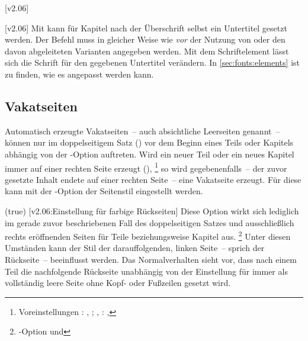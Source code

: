 \begin{DeclareEntity*}{}
\begin{DeclareEntity*}{}
\begin{DeclareEntity*}{}
\begin{Declaration}
  {}
  [v2.06]
\begin{Declaration}
  {}
  [v2.06]
Mit  kann für Kapitel nach der 
Überschrift selbst ein Untertitel gesetzt werden. Der Befehl muss in gleicher 
Weise wie  \emph{vor} der Nutzung von  
oder den davon abgeleiteten Varianten angegeben werden. Mit dem Schriftelement 
 lässt sich die Schrift für den gegebenen Untertitel 
verändern. In \autoref{sec:fonts:elements} ist zu finden, wie es angepasst 
werden kann.
%
\end{Declaration}
\end{Declaration}



\subsection{%
  Vakatseiten%
  \label{sec:vacat}%
}
%
Automatisch erzeugte Vakatseiten~-- auch absichtliche Leerseiten genannt~-- 
können nur im doppelseitigem Satz () vor dem Beginn eines 
Teils oder Kapitels abhängig von der \KOMAScript-Option 
 auftreten. Wird ein neuer Teil oder 
ein neues Kapitel immer auf einer rechten Seite erzeugt (),%
\footnote{%
  Voreinstellungen
  : 
  , ;
  , : 
  , %
}
so wird gegebenenfalls~-- der zuvor gesetzte Inhalt endete auf einer rechten 
Seite~-- eine Vakatseite erzeugt. Für diese kann mit der \KOMAScript-Option 
 der Seitenstil 
eingestellt werden.

\begin{Declaration}
  {}
  (true)
  [v2.06:Einstellung für farbige Rückseiten]
Diese Option wirkt sich lediglich im gerade zuvor beschriebenen Fall des 
doppelseitigen Satzes und ausschließlich rechts eröffnenden Seiten für Teile 
beziehungsweise Kapitel aus.%
\footnote{%
  \KOMAScript-Option  und %
}
Unter diesen Umständen kann der Stil der darauffolgenden, linken Seite~-- 
sprich der Rückseite~-- beeinflusst werden. Das Normalverhalten sieht vor, dass 
nach einem Teil die nachfolgende Rückseite unabhängig von der Einstellung für 
 immer als vollständig leere Seite ohne Kopf- oder 
Fußzeilen gesetzt wird.


\end{Declaration}
\end{DeclareEntity*}
\end{DeclareEntity*}
\end{DeclareEntity*}
